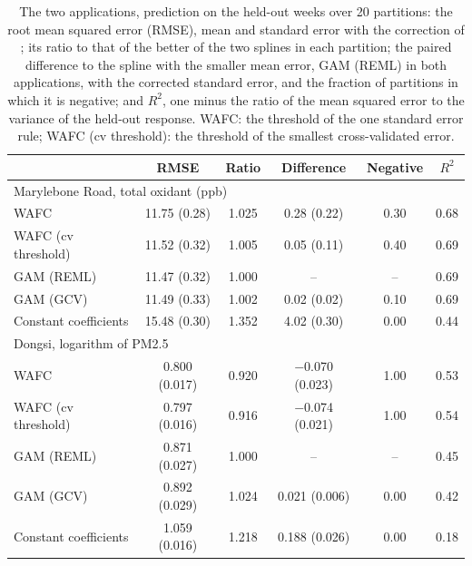 \begin{table}[tp]
\caption{The two applications, prediction on the held-out weeks over 20
partitions: the root mean squared error (RMSE), mean and standard error with
the correction of \citet{Nadeau-Bengio-2003}; its ratio to that of the better
of the two splines in each partition; the paired difference to the spline
with the smaller mean error, GAM (REML) in both applications, with the
corrected standard error, and the fraction of partitions in which it is
negative; and $R^2$, one minus the ratio of the mean squared error to the
variance of the held-out response. WAFC: the threshold of the one standard
error rule; WAFC (cv threshold): the threshold of the smallest
cross-validated error.}
\label{tab:app-prediction}
\centering
\small
\begin{tabular}{lccccc}
\hline
 & RMSE & Ratio & Difference & Negative & $R^2$ \\
\hline
\multicolumn{6}{l}{Marylebone Road, total oxidant (ppb)} \\
WAFC & 11.75 (0.28) & 1.025 & 0.28 (0.22) & 0.30 & 0.68 \\
WAFC (cv threshold) & 11.52 (0.32) & 1.005 & 0.05 (0.11) & 0.40 & 0.69 \\
GAM (REML) & 11.47 (0.32) & 1.000 & -- & -- & 0.69 \\
GAM (GCV) & 11.49 (0.33) & 1.002 & 0.02 (0.02) & 0.10 & 0.69 \\
Constant coefficients & 15.48 (0.30) & 1.352 & 4.02 (0.30) & 0.00 & 0.44 \\
\hline
\multicolumn{6}{l}{Dongsi, logarithm of PM2.5} \\
WAFC & 0.800 (0.017) & 0.920 & $-$0.070 (0.023) & 1.00 & 0.53 \\
WAFC (cv threshold) & 0.797 (0.016) & 0.916 & $-$0.074 (0.021) & 1.00 & 0.54 \\
GAM (REML) & 0.871 (0.027) & 1.000 & -- & -- & 0.45 \\
GAM (GCV) & 0.892 (0.029) & 1.024 & 0.021 (0.006) & 0.00 & 0.42 \\
Constant coefficients & 1.059 (0.016) & 1.218 & 0.188 (0.026) & 0.00 & 0.18 \\
\hline
\end{tabular}
\end{table}
